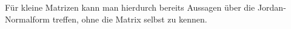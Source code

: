 Für kleine Matrizen kann man hierdurch bereits Aussagen über die Jordan-Nor\-mal\-form treffen, ohne die Matrix selbst zu kennen.


% 
% 
% 
% 
% 
% 
